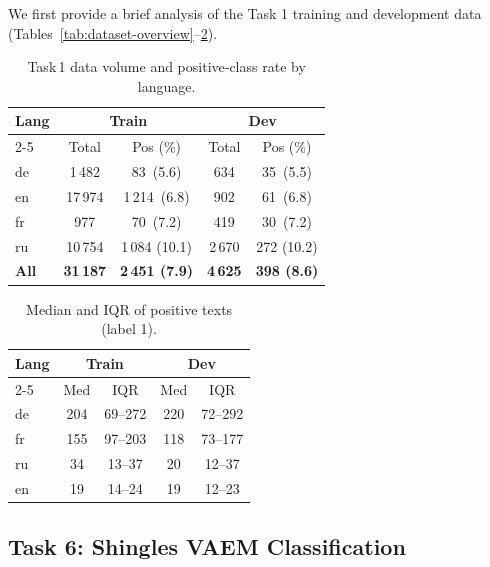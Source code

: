 \documentclass[letterpaper]{article} %
\begin{document}
We first provide a brief analysis of the Task 1 training and development data (Tables~\ref{tab:dataset-overview}–\ref{tab:pos-length}).

\begin{table}[htbp]
\centering
\small
\setlength{\tabcolsep}{4pt}
\caption{Task 1 data volume and positive‐class rate by language.}
\label{tab:data-volume-label}
\begin{tabular}{|l|cc|cc|}
\hline
\multirow{2}{*}{\textbf{Lang}} &
\multicolumn{2}{c|}{\textbf{Train}} &
\multicolumn{2}{c|}{\textbf{Dev}} \\ \cline{2-5}
 & Total & Pos (\%) & Total & Pos (\%) \\
\hline
de & 1\,482 & 83 \,(5.6) & 634 & 35 \,(5.5) \\
en & 17\,974 & 1\,214 \,(6.8) & 902 & 61 \,(6.8) \\
fr & 977 & 70 \,(7.2) & 419 & 30 \,(7.2) \\
ru & 10\,754 & 1\,084 (10.1) & 2\,670 & 272 (10.2) \\
\hline
\textbf{All} & \textbf{31\,187} & \textbf{2\,451 (7.9)} & \textbf{4\,625} & \textbf{398 (8.6)} \\
\hline
\end{tabular}
\setlength{\tabcolsep}{6pt}
\normalsize
\end{table}


\begin{table}[htbp]
\centering
\setlength{\tabcolsep}{6pt}
\caption{Median and IQR of positive texts (label 1).}
\label{tab:pos-length}
\begin{tabular}{|l|cc|cc|}
\hline
\multirow{2}{*}{\textbf{Lang}} & \multicolumn{2}{c|}{\textbf{Train}} & \multicolumn{2}{c|}{\textbf{Dev}} \\ \cline{2-5}
 & Med & IQR & Med & IQR \\
\hline
de & 204 & 69–272 & 220 & 72–292 \\
fr & 155 & 97–203 & 118 & 73–177 \\
ru & 34 & 13–37 & 20 & 12–37 \\
en & 19 & 14–24 & 19 & 12–23 \\
\hline
\end{tabular}
\setlength{\tabcolsep}{6pt}
\normalsize
\end{table}



\subsection{Task 6: Shingles VAEM Classification}
\end{document}
